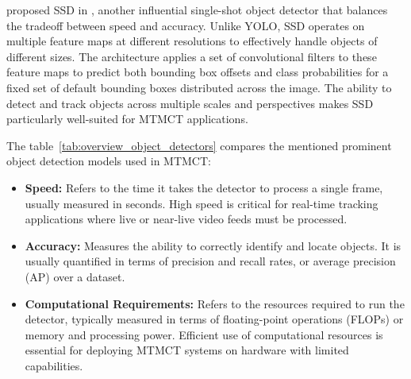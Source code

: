 \citeauthor{Liu15} proposed SSD in \citeyear{Liu15}, another influential single-shot object detector that balances the tradeoff between speed and accuracy. Unlike YOLO, SSD operates on multiple feature maps at different resolutions to effectively handle objects of different sizes. The architecture applies a set of convolutional filters to these feature maps to predict both bounding box offsets and class probabilities for a fixed set of default bounding boxes distributed across the image. The ability to detect and track objects across multiple scales and perspectives makes SSD particularly well-suited for MTMCT applications.

\begin{table}[ht]
    \centering
    \caption{Overview Object Detectors}\label{tab:overview_object_detectors}
\end{table}

The table~\ref{tab:overview_object_detectors} compares the mentioned prominent object detection models used in MTMCT:

\begin{itemize}
    \item \textbf{Speed:} Refers to the time it takes the detector to process a single frame, usually measured in seconds. High speed is critical for real-time tracking applications where live or near-live video feeds must be processed.
    \item \textbf{Accuracy:} Measures the ability to correctly identify and locate objects. It is usually quantified in terms of precision and recall rates, or average precision (AP) over a dataset.
    \item \textbf{Computational Requirements:} Refers to the resources required to run the detector, typically measured in terms of floating-point operations (FLOPs) or memory and processing power. Efficient use of computational resources is essential for deploying MTMCT systems on hardware with limited capabilities.
\end{itemize}

